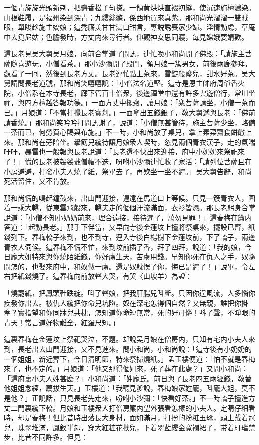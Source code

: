 一個青旋旋光頭新剃，把麝香松子匀搽。一領黄烘烘直裰初縫，使沉速旃檀濃染。山根鞋履，是福州染到深青；九縷絲縧，係西地買來真紫。那和尚光溜溜一雙賊眼，單睃趁施主嬌娘；這秃廝羙甘甘滿口甜言，專説誘喪家少婦。淫情動䖏，草庵中去覓尼姑；色膽發時，方丈内來尋行者。仰觀神女思同寢，每見嫦娥要媾歡。

這長老見吴大舅吴月娘，向前合掌道了問訊，連忙喚小和尚開了佛殿：「請施主菩薩隨喜遊玩，小僧看茶。」那小沙彌開了殿門，領月娘一簇男女，前後兩廊參拜，觀看了一囘，然後到長老方丈。長老連忙點上茶來，雪錠般盞兒，甜水好茶。吴大舅請問長老道號，那和尚笑嘻嘻說：「小僧法名道堅。這寺是恩主帥府周爺香火院，小僧忝在本寺長老，廊下管百十僧衆，後邊禪堂中還有許多雲遊僧行，常川坐禪，與四方檀越答報功德。」一面方丈中擺齋，讓月娘：「衆菩薩請坐，小僧一茶而已。」月娘道：「不當打攪長老寳刹。」一面拿出五錢銀子，敎大舅遞與長老：「佛前請香燒。」那和尚笑吟吟打問訊謝了，說道：「小僧無甚管待，施主菩薩少坐，略備一茶而已，何勞費心賜與布施。」不一時，小和尚放了桌兒，拿上素菜齋食餅饊上來。那和尚在旁陪坐。擧筯兒纔待讓月娘衆人喫時，忽見兩個青衣漢子，走的氣喘吁吁，暴雷也一般報與長老說道：「長老還不快出來迎接，府中小奶奶來祭祀來了！」慌的長老披袈裟戴僧帽不迭，吩咐小沙彌連忙收了家活：「請列位菩薩且在小房避避，打發小夫人燒了紙，祭畢去了，再欵坐一坐不遲。」吴大舅告辭，和尚死活留住，又不肯放。

那和尚慌的鳴起鐘鼓來，出山門迎接，遠遠在馬道口上等候。只見一簇青衣人，圍着一乘大轎，従東雲飛般來，轎夫走的個個汗流滿面，衣衫皆濕。那長老躬身合掌說道：「小僧不知小奶奶前來，理合遠接，接待遲了，萬勿見罪！」這春梅在簾内答道：「起動長老。」那手下伴當，又早向寺後金蓮坟上擡將祭桌來，擺設已齊，紙錢列下。春梅轎子來到，也不到寺，逕入寺後白楊樹下金蓮坟前，下了轎子，兩邊青衣人伺候。這春梅不慌不忙，來到坟前插了香，拜了四拜，說道：「我的娘，今日龐大姐特來與你燒陌紙錢，你好䖏生天，苦䖏用錢。早知你死在仇人之手，奴隨問怎的，也娶來府中，和奴做一䖏。還是奴躭悮了你，悔已是遲了！」說畢，令左右把紙錢燒了。這春梅向前放聲大哭，有哭〈山坡羊〉為證：

「燒罷紙，把鳳頭鞋跌綻。呌了聲娘，把我肝腸兒呌斷。只因你逞風流，人多惱你疾發你出去。被仇人纔把你命兒坑陷。奴在深宅怎得個自然？又無親，誰把你掛牽？實指望和你同牀兒共枕，怎知道你命短無常，死的好可憐！呌了聲，不睜眼的青天！常言道好物難全，紅羅尺短。」

這裏春梅在金蓮坟上祭祀哭泣，不題。却說吴月娘在僧房内，只知有宅内小夫人來到，長老出去山門迎接，又不見進來。問小和尚，小和尚說：「這寺後有小奶奶的一個姐姐，新近葬下，今日清明節，特來祭掃燒紙。」孟玉樓便道：「怕不就是春梅來了，也不定的。」月娘道：「他又那得個姐來，死了葬在此處？」又問小和尚：「這府裏小夫人姓甚麽？」小和尚道：「姓龐氏。前日與了長老四五兩經錢，敎替他姐姐念經，薦拔生天。」玉樓道：「我聽見爹說，春梅娘家姓龐，呌龐大姐，莫不是他？」正說話，只見長老先走來，吩咐小沙彌：「快看好茶。」不一時轎子擡進方丈二門裏纔下轎。月娘和玉樓衆人打僧房簾内望外張看怎樣的小夫人。定睛仔細看時，却是春梅！但比昔時出落長大身材，面如滿月，打扮的粉粧玉琢，頭上戴着冠兒，珠翠堆滿，鳳釵半卸，穿大紅粧花襖兒，下着翠藍縷金寬襴裙子，带着玎璫禁步，比昔不同許多。但見：

